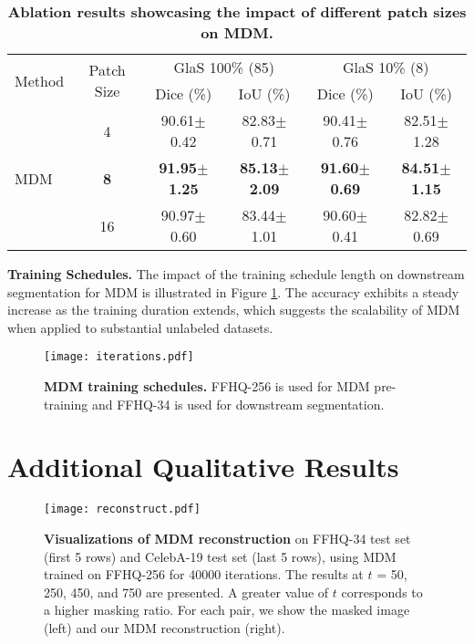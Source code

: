 \documentclass{article} \usepackage{iclr2024_conference,times}
\begin{document}
\begin{table*}[htp]
    \centering
    \caption{\textbf{Ablation results showcasing the impact of different patch sizes on MDM.}}
    \small \begin{tabular}{lccccc}
        \toprule
         \multirow{2}{*}{Method} &\multirow{2}{*}{Patch Size} & \multicolumn{2}{c}{GlaS 100\% (85)} &\multicolumn{2}{c}{GlaS 10\% (8)}\\
         \cmidrule(lr){3-4} \cmidrule(lr){5-6}
        && Dice (\%) & IoU (\%) &Dice (\%) &IoU (\%)\\
        \midrule
        \multirow{3}{*}{MDM} &4        &90.61$\pm$0.42 &82.83$\pm$0.71 &90.41$\pm$0.76  &82.51$\pm$1.28 \\
        &\textbf{8} &\textbf{91.95$\pm$1.25}  &\textbf{85.13$\pm$2.09} 
                   &\textbf{91.60$\pm$0.69}  &\textbf{84.51$\pm$1.15} \\
        &16       &90.97$\pm$0.60 &83.44$\pm$1.01 &90.60$\pm$0.41  &82.82$\pm$0.69 \\
        \bottomrule
    \end{tabular}
    \label{Patch_size}
\end{table*}


\textbf{Training Schedules.} 
The impact of the training schedule length on downstream segmentation for MDM is illustrated in Figure \ref{Training_schedule}. The accuracy exhibits a steady increase as the training duration extends, which suggests the scalability of MDM when applied to substantial unlabeled datasets.

\begin{figure}[!htp]
\centering
\texttt{[image: iterations.pdf]} \caption{\textbf{MDM training schedules.} FFHQ-256 is used for MDM pre-training and FFHQ-34 is used for downstream segmentation.}
\label{Training_schedule}
\end{figure}





\section{Additional Qualitative Results}
\begin{figure}[htbp]
\centering
\texttt{[image: reconstruct.pdf]} \caption{\textbf{ Visualizations of MDM reconstruction} on FFHQ-34 test set (first 5 rows) and CelebA-19 test set (last 5 rows), using MDM trained on FFHQ-256 for 40000 iterations. The results at $t$ = 50, 250, 450, and 750 are presented. A greater value of $t$ corresponds to a higher masking ratio. For each pair, we show the masked image (left) and our MDM reconstruction (right).}
\label{reconstruction}
\end{figure}
\end{document}
